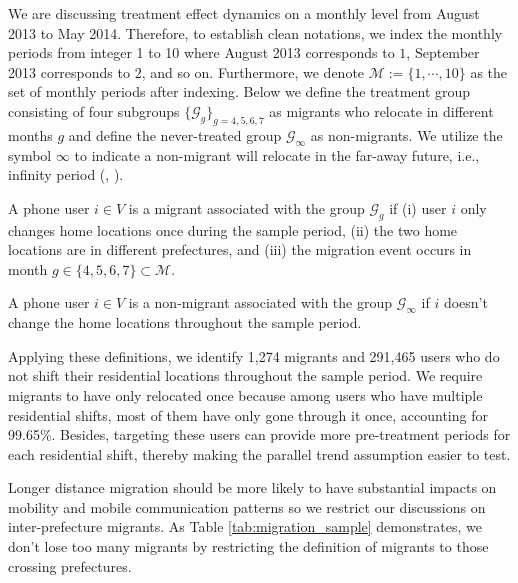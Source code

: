 We are discussing treatment effect dynamics on a monthly level from August 2013 to May 2014. Therefore, to establish clean notations, we index the monthly periods from integer 1 to 10 where August 2013 corresponds to $1$, September 2013 corresponds to $2$, and so on. Furthermore, we denote $\mathcal{M} := \{1, \cdots, 10\}$ as the set of monthly periods after indexing. Below we define the treatment group consisting of four subgroups $\{ \mathcal{G}_g \}_{g=4,5,6,7}$ as migrants who relocate in different months $g$ and define the never-treated group $\mathcal{G}_{\infty}$ as non-migrants. We utilize the symbol $\infty$ to indicate a non-migrant will relocate in the far-away future, i.e., infinity period (\cite{sun2021estimating}, \cite{borusyak2024revisiting}).

\begin{definition}[Migrants]\label{def:migrants}
A phone user $i \in V$ is a migrant associated with the group $\mathcal{G}_g$ if (i) user $i$ only changes home locations once during the sample period, (ii) the two home locations are in different prefectures, and (iii) the migration event occurs in month $g \in \{4,5,6,7\} \subset \mathcal{M}$.
\end{definition}

\begin{definition}
A phone user $i \in V$ is a non-migrant associated with the group $\mathcal{G}_{\infty}$ if $i$ doesn't change the home locations throughout the sample period.
\end{definition}


Applying these definitions, we identify 1,274 migrants and 291,465 users who do not shift their residential locations throughout the sample period.
We require migrants to have only relocated once because among users who have multiple residential shifts, most of them have only gone through it once, accounting for 99.65\%.
Besides, targeting these users can provide more pre-treatment periods for each residential shift, thereby making the parallel trend assumption easier to test.

Longer distance migration should be more likely to have substantial impacts on mobility and mobile communication patterns so we restrict our discussions on inter-prefecture migrants. As Table \ref{tab:migration_sample} demonstrates, we don't lose too many migrants by restricting the definition of migrants to those crossing prefectures.

